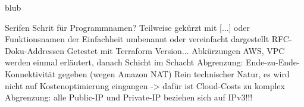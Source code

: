 blub

\ifFalse
Serifen Schrit für Programmnamen?
Teilweise gekürzt mit [...] oder Funktionsnamen der Einfachheit umbenannt oder vereinfacht dargestellt
RFC-Doku-Addressen
Getestet mit Terraform Version...
Abkürzungen AWS, VPC werden einmal erläutert, danach Schicht im Schacht
Abgrenzung: Ende-zu-Ende-Konnektivität gegeben (wegen Amazon NAT)
Rein technischer Natur, es wird nicht auf Kostenoptimierung eingangen -> dafür ist Cloud-Costs zu komplex
Abgrenzung: alle Public-IP und Private-IP beziehen sich auf IPv3!!!
\fi
